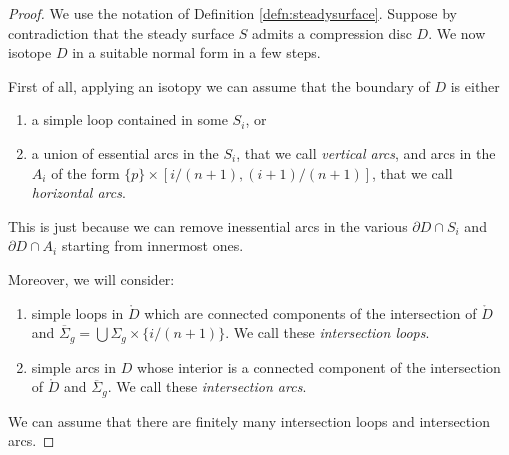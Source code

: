 \documentclass[11pt, oneside]{amsart}
\theoremstyle{definition}
\theoremstyle{definition}
\begin{document}
\begin{proof}
 We use the notation of Definition \ref{defn:steadysurface}. Suppose by contradiction that the steady surface $S$ admits a compression disc $D$. We now isotope $D$ in a suitable normal form in a few steps.
 
 First of all, applying an isotopy we can assume that the boundary of $D$ is either
 \begin{enumerate}
  \item a simple loop contained in some $S_i$, or\label{item:loop}
  \item a union of essential arcs in the $S_i$, that we call \emph{vertical arcs}, and arcs in the $A_i$ of the form $\{p\}\times  [i/(n+1),(i+1)/(n+1)]$, that we call \emph{horizontal arcs}.\label{item:arcs}
 \end{enumerate}
 
 This is just because we can remove inessential arcs in the various $\partial D\cap S_i$ and $\partial D\cap A_i$ starting from innermost ones.
 
 Moreover, we will consider:
 \begin{enumerate}
  \item simple loops in $\mathring D$ which are connected components of the intersection of $\mathring D$ and $\overline{\Sigma}_g=\bigcup \Sigma_g\times\{i/(n+1)\}$. We call these \emph{intersection loops}.
  \item simple arcs in $D$ whose interior is a connected component of the intersection of $\mathring D$ and $\overline{\Sigma}_g$. We call these \emph{intersection arcs}.
 \end{enumerate}

 We can assume that there are finitely many intersection loops and intersection arcs.
 
 

\end{proof}
\end{document}

